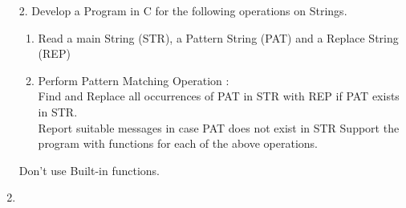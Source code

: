 \documentclass{article}
\newcommand{\answer}{\item [$\rightarrow$]}
\begin{document}
	\begin{enumerate}
		\item [2.] Develop a Program in C for the following operations on Strings.
		\begin{enumerate}[label=\alph*.]
			\item Read a main String (STR), a Pattern String (PAT) and a Replace String (REP)
			\item Perform Pattern Matching Operation : \\
			Find and Replace all occurrences of PAT in STR with REP if PAT exists in STR. \\
			Report suitable messages in case PAT does not exist in STR Support the program with functions for each of the above operations.
		\end{enumerate}
		Don't use Built-in functions.

		\answer \inputminted{c}{../../Program2.c}
	\end{enumerate}
\end{document}

